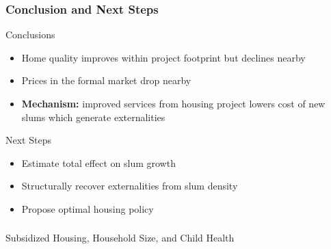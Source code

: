 \documentclass[aspectratio=149]{beamer}
\begin{document}
\begin{frame}
\frametitle{Conclusion and Next Steps}

Conclusions
\begin{itemize}
\item Home quality improves within project footprint but declines nearby
\item Prices in the formal market drop nearby
\item \textbf{Mechanism:} improved services from housing project lowers cost of new slums which generate externalities
\end{itemize}
\vspace{.2cm}

Next Steps
\begin{itemize}
\item Estimate total effect on slum growth
\item Structurally recover externalities from slum density
\item Propose optimal housing policy
\end{itemize}


\end{frame}




\begin{frame}
\frametitle{}
\centering
{\Large \color{darkred} Subsidized Housing, Household Size, and Child Health} \\
\vspace{.4cm}
\end{frame}

\end{document}
